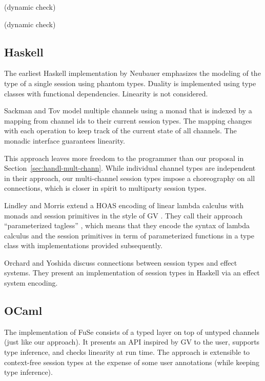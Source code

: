 \documentclass[acmsmall,screen,anonymous,review]{acmart}
\begin{document}

\cite{DBLP:conf/fase/HuY16} (dynamic check)

\cite{DBLP:conf/fase/HuY17} (dynamic check)

\subsection{Haskell}
\label{sec:hask-impl}

The earliest Haskell implementation by Neubauer \cite{DBLP:conf/padl/NeubauerT04}
emphasizes the modeling of the type of a single session using phantom
types. Duality is implemented using type classes with functional
dependencies. Linearity is not considered.

Sackman \cite{SackmanE08} and Tov \cite{DBLP:conf/popl/TovP11} model
multiple channels using a monad that is indexed by a mapping
from channel ids to their current session types. The mapping changes
with each operation to keep track of the current state of all
channels. The monadic interface guarantees linearity.

This approach leaves more freedom to the programmer than our proposal
in Section~\ref{sec:handl-mult-chann}. While individual channel types
are independent in their approach, our multi-channel session types
impose a choreography on all connections, which is closer in spirit to
multiparty session types. 

Lindley and Morris \cite{DBLP:conf/haskell/LindleyM16} extend a HOAS
encoding of linear lambda calculus with monads and session primitives
in the style of GV \cite{DBLP:journals/jfp/GayV10}. They call their approach
``parameterized tagless'' \cite{DBLP:journals/jfp/CaretteKS09}, which means that they encode the syntax of
lambda calculus and the session primitives in term of parameterized
functions in a type class with implementations provided subsequently.

Orchard and Yoshida \cite{DBLP:conf/popl/OrchardY16} discuss
connections between session types and effect systems. They present an
implementation of session types in Haskell via an effect system encoding.


\subsection{OCaml}
\label{sec:ocaml}

The implementation of FuSe \cite{DBLP:journals/jfp/Padovani17}
consists of a typed layer on top of untyped channels (just like our
approach).  It presents an API inspired by GV to the user, supports
type inference, and checks linearity at run time. The approach is
extensible to context-free session types
\cite{DBLP:journals/toplas/Padovani19} at the expense of some user
annotations (while keeping type inference).
\end{document}
